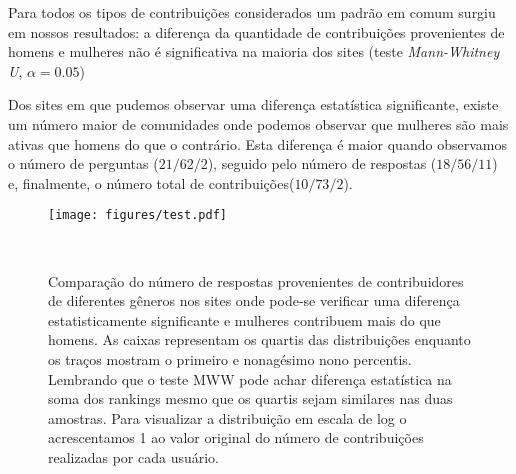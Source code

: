 Para todos os tipos de contribuições considerados um padrão em comum surgiu em nossos resultados: a diferença da quantidade de contribuições provenientes de homens e mulheres não é significativa na maioria dos sites (teste \emph{Mann-Whitney U}, $\alpha = 0.05$)


Dos sites em que pudemos observar uma diferença estatística significante, existe um número maior de comunidades onde podemos observar que mulheres são mais ativas que homens do que o contrário. Esta diferença é maior quando observamos o número de perguntas ($21/62/2$), seguido pelo número de respostas ($18/56/11$) e, finalmente, o número total de contribuições($10/73/2$). 

\begin{figure}
  \centering
  \texttt{[image: figures/test.pdf]}
  \caption[Comparação do número de respostas em comunidades onde mulheres respondem mais.]{Comparação do número de respostas provenientes de contribuidores de diferentes gêneros nos sites onde pode-se verificar uma diferença estatisticamente significante e mulheres contribuem mais do que homens. As caixas representam os quartis das distribuições enquanto os traços mostram o primeiro e nonagésimo nono percentis. Lembrando que o teste MWW pode achar diferença estatística na soma dos rankings mesmo que os quartis sejam similares nas duas amostras. Para visualizar a distribuição em escala de log o acrescentamos 1 ao valor original do número de contribuições realizadas por cada usuário.}~\label{figure:answers}
\end{figure}


